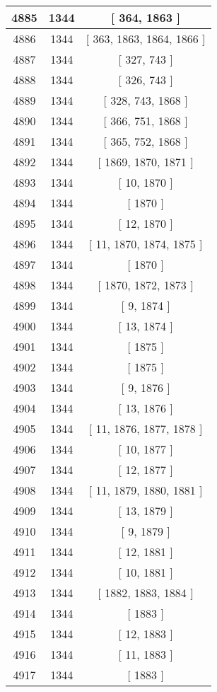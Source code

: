 \begin{center}
\begin{longtable}[H]{|| c c c ||}
\hline
4885 & 1344 & [ 364, 1863 ] \\ 
\hline
4886 & 1344 & [ 363, 1863, 1864, 1866 ] \\ 
\hline
4887 & 1344 & [ 327, 743 ] \\ 
\hline
4888 & 1344 & [ 326, 743 ] \\ 
\hline
4889 & 1344 & [ 328, 743, 1868 ] \\ 
\hline
4890 & 1344 & [ 366, 751, 1868 ] \\ 
\hline
4891 & 1344 & [ 365, 752, 1868 ] \\ 
\hline
4892 & 1344 & [ 1869, 1870, 1871 ] \\ 
\hline
4893 & 1344 & [ 10, 1870 ] \\ 
\hline
4894 & 1344 & [ 1870 ] \\ 
\hline
4895 & 1344 & [ 12, 1870 ] \\ 
\hline
4896 & 1344 & [ 11, 1870, 1874, 1875 ] \\ 
\hline
4897 & 1344 & [ 1870 ] \\ 
\hline
4898 & 1344 & [ 1870, 1872, 1873 ] \\ 
\hline
4899 & 1344 & [ 9, 1874 ] \\ 
\hline
4900 & 1344 & [ 13, 1874 ] \\ 
\hline
4901 & 1344 & [ 1875 ] \\ 
\hline
4902 & 1344 & [ 1875 ] \\ 
\hline
4903 & 1344 & [ 9, 1876 ] \\ 
\hline
4904 & 1344 & [ 13, 1876 ] \\ 
\hline
4905 & 1344 & [ 11, 1876, 1877, 1878 ] \\ 
\hline
4906 & 1344 & [ 10, 1877 ] \\ 
\hline
4907 & 1344 & [ 12, 1877 ] \\ 
\hline
4908 & 1344 & [ 11, 1879, 1880, 1881 ] \\ 
\hline
4909 & 1344 & [ 13, 1879 ] \\ 
\hline
4910 & 1344 & [ 9, 1879 ] \\ 
\hline
4911 & 1344 & [ 12, 1881 ] \\ 
\hline
4912 & 1344 & [ 10, 1881 ] \\ 
\hline
4913 & 1344 & [ 1882, 1883, 1884 ] \\ 
\hline
4914 & 1344 & [ 1883 ] \\ 
\hline
4915 & 1344 & [ 12, 1883 ] \\ 
\hline
4916 & 1344 & [ 11, 1883 ] \\ 
\hline
4917 & 1344 & [ 1883 ] \\ 

\end{longtable}
\end{center}
